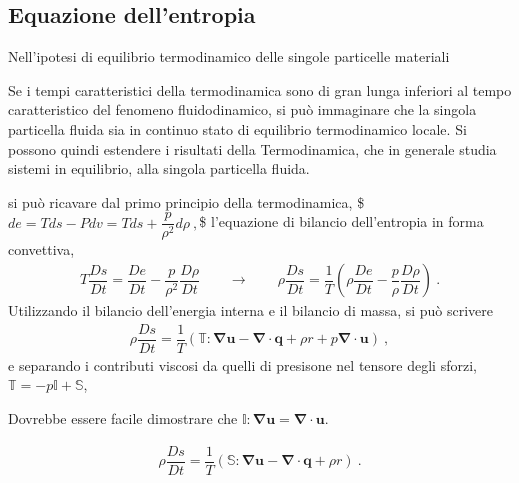 \documentclass[letterpaper,10pt,italian]{jupyterBook}
\begin{document}
\subsection{Equazione dell’entropia}
\label{\detokenize{polimi/fluidmechanics-ita/template/capitoli/04_bilanci/04teoria:equazione-dell-entropia}}
\sphinxAtStartPar
Nell’ipotesi di equilibrio termodinamico delle singole particelle
materiali%
\begin{footnote}[2]\sphinxAtStartFootnote
Se i tempi caratteristici della termodinamica sono di gran lunga
inferiori al tempo caratteristico del fenomeno fluidodinamico, si
può immaginare che la singola particella fluida sia in continuo
stato di equilibrio termodinamico locale. Si possono quindi
estendere i risultati della Termodinamica, che in generale studia
sistemi in equilibrio, alla singola particella fluida.
%
\end{footnote} si può ricavare dal primo principio della termodinamica,
\$\(de = T ds - P dv = T ds + \dfrac{p}{\rho^2} d\rho \ ,\)\$ l’equazione di
bilancio dell’entropia in forma convettiva,
\begin{equation*}
\begin{split}T \dfrac{D s}{D t} = \dfrac{D e}{D t} - \dfrac{p}{\rho^2} \dfrac{D \rho}{D t} \qquad \rightarrow \qquad
 \rho \dfrac{D s}{D t} = \dfrac{1}{T} \left( \rho \dfrac{D e}{D t} -  \dfrac{p}{\rho} \dfrac{D \rho}{D t} \right) \ .\end{split}
\end{equation*}
\sphinxAtStartPar
Utilizzando il bilancio dell’energia interna e il bilancio di massa, si
può scrivere
\begin{equation*}
\begin{split}\rho \dfrac{D s}{D t} = \dfrac{1}{T} \left( \mathbb{T} : \mathbf{\nabla} \mathbf{u} - \mathbf{\nabla} \cdot \mathbf{q} + \rho r + p \mathbf{\nabla} \cdot \mathbf{u} \right) \ ,\end{split}
\end{equation*}
\sphinxAtStartPar
e separando i contributi viscosi da quelli di presisone nel tensore
degli sforzi, \(\mathbb{T} = - p \mathbb{I} + \mathbb{S}\),%
\begin{footnote}[3]\sphinxAtStartFootnote
Dovrebbe essere facile dimostrare che
\(\mathbb{I}:\mathbf{\nabla}\mathbf{u} = \mathbf{\nabla} \cdot \mathbf{u}\).
%
\end{footnote}
\begin{equation*}
\begin{split}\rho \dfrac{D s}{D t} = \dfrac{1}{T} \left( \mathbb{S} : \mathbf{\nabla} \mathbf{u} - \mathbf{\nabla} \cdot \mathbf{q} + \rho r \right) \ .\end{split}
\end{equation*}
\end{document}

